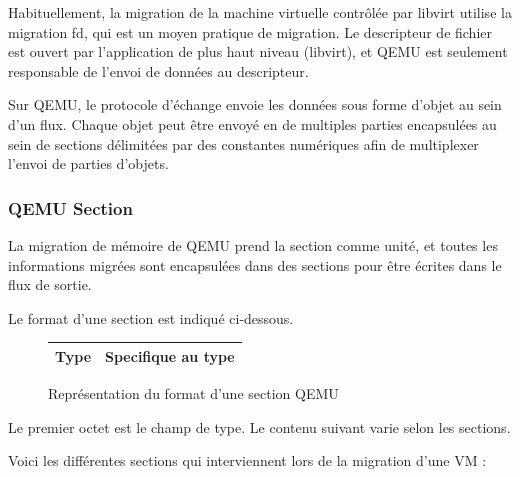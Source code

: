 Habituellement, la migration de la machine virtuelle contrôlée par libvirt utilise la migration fd, qui est un moyen pratique de migration.
Le descripteur de fichier est ouvert par l'application de plus haut niveau (libvirt), et QEMU est seulement responsable de l'envoi de données au descripteur.


Sur QEMU, le protocole d'échange envoie les données sous forme d'objet au sein d'un flux.
Chaque objet peut être envoyé en de multiples parties encapsulées au sein de sections délimitées par des constantes numériques afin de multiplexer l'envoi de parties d'objets.

\subsubsection*{QEMU Section}

La migration de mémoire de QEMU prend la section comme unité, et toutes les informations migrées sont encapsulées dans des sections pour être écrites dans le flux de sortie. 

Le format d'une section est indiqué ci-dessous. 

\begin{figure}[H]
    \centering
    \begin{tabular}{|c | c|} 
        \hline
        Type & Specifique au type\\ 
        \hline
    \end{tabular}
    \caption{Représentation du format d'une section QEMU}

\end{figure}

Le premier octet est le champ de type.
Le contenu suivant varie selon les sections.

Voici les différentes sections qui interviennent lors de la migration d'une VM :

